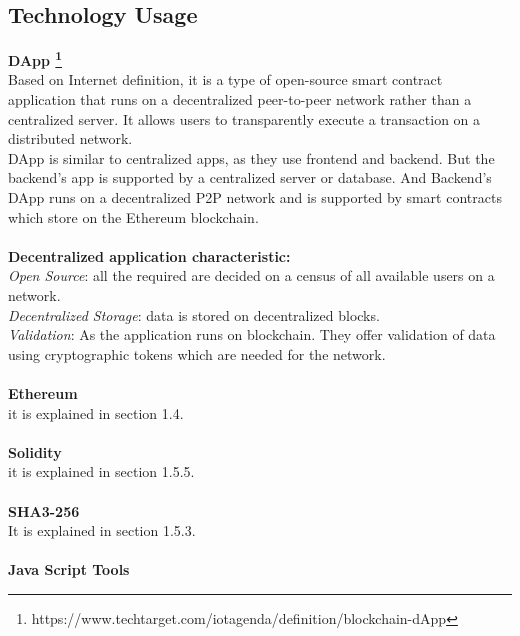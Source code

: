 \subsection{Technology Usage}
\textbf{DApp \footnote{https://www.techtarget.com/iotagenda/definition/blockchain-dApp}} \\
Based on Internet definition, it is a type of open-source smart contract application that runs on a decentralized peer-to-peer network rather than a centralized server. It allows users to transparently execute a transaction on a distributed network. \\
DApp is similar to centralized apps, as they use frontend and backend. But the backend's app is supported by a centralized server or database. And Backend's DApp runs on a decentralized P2P network and is supported by smart contracts which store on the Ethereum blockchain.\\
\\
\textbf{Decentralized application characteristic:}\\
	\textit{Open Source}: all the required are decided on a census of all available users on a network.\\
	\textit{Decentralized Storage}: data is stored on decentralized blocks.\\
	\textit{Validation}: As the application runs on blockchain. They offer validation of data using cryptographic tokens which are needed for the network. \\
 \\
\textbf{Ethereum} \\
it is explained in section 1.4.\\
\\
\textbf{Solidity} \\
it is explained in section 1.5.5.\\
\\
\textbf{SHA3-256} \\It is explained in section 1.5.3.\\
\\
\textbf{Java Script Tools} 
